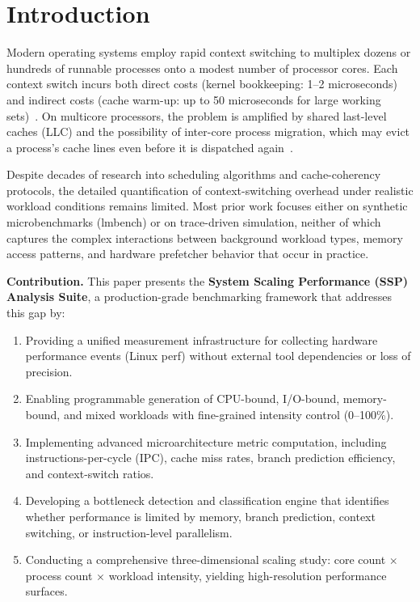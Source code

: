 \documentclass[conference]{IEEEtran}
\begin{document}
\section{Introduction}
\label{sec:intro}

Modern operating systems employ rapid context switching to multiplex dozens or
hundreds of runnable processes onto a modest number of processor cores. Each
context switch incurs both direct costs (kernel bookkeeping: 1--2 microseconds)
and indirect costs (cache warm-up: up to 50 microseconds for large working
sets)~\cite{li2007quantifying}. On multicore processors, the problem is
amplified by shared last-level caches (LLC) and the possibility of inter-core
process migration, which may evict a process's cache lines even before it is
dispatched again~\cite{blagodurov2011numa}.

Despite decades of research into scheduling algorithms and cache-coherency
protocols, the detailed quantification of context-switching overhead under
realistic workload conditions remains limited. Most prior work focuses either on
synthetic microbenchmarks (lmbench) or on trace-driven simulation, neither of
which captures the complex interactions between background workload types,
memory access patterns, and hardware prefetcher behavior that occur in practice.

\textbf{Contribution.} This paper presents the \textbf{System Scaling Performance
(SSP) Analysis Suite}, a production-grade benchmarking framework that addresses
this gap by:

\begin{enumerate}
  \item Providing a unified measurement infrastructure for collecting
        hardware performance events (Linux perf) without external tool
        dependencies or loss of precision.
  \item Enabling programmable generation of CPU-bound, I/O-bound, memory-bound,
        and mixed workloads with fine-grained intensity control (0--100\%).
  \item Implementing advanced microarchitecture metric computation, including
        instructions-per-cycle (IPC), cache miss rates, branch prediction
        efficiency, and context-switch ratios.
  \item Developing a bottleneck detection and classification engine that
        identifies whether performance is limited by memory, branch prediction,
        context switching, or instruction-level parallelism.
  \item Conducting a comprehensive three-dimensional scaling study: core count
        $\times$ process count $\times$ workload intensity, yielding
        high-resolution performance surfaces.
\end{enumerate}
\end{document}
